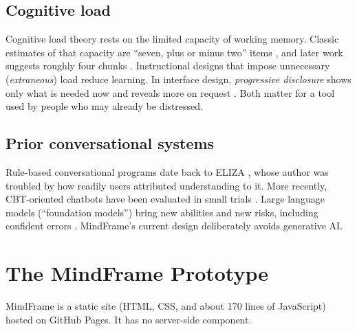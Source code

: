 \documentclass[11pt]{article}
\begin{document}
\subsection{Cognitive load}
Cognitive load theory \citep{sweller1988} rests on the limited capacity of working memory. Classic estimates of that capacity are ``seven, plus or minus two'' items \citep{miller1956}, and later work suggests roughly four chunks \citep{cowan2001}. Instructional designs that impose unnecessary (\emph{extraneous}) load reduce learning. In interface design, \emph{progressive disclosure} shows only what is needed now and reveals more on request \citep{nielsen2006}. Both matter for a tool used by people who may already be distressed.

\subsection{Prior conversational systems}
Rule-based conversational programs date back to ELIZA \citep{weizenbaum1966}, whose author was troubled by how readily users attributed understanding to it. More recently, CBT-oriented chatbots have been evaluated in small trials \citep[e.g.,][]{fitzpatrick2017}. Large language models (``foundation models'') bring new abilities and new risks, including confident errors \citep{bommasani2021}. MindFrame's current design deliberately avoids generative AI.

\section{The MindFrame Prototype}
MindFrame is a static site (HTML, CSS, and about 170 lines of JavaScript) hosted on GitHub Pages. It has no server-side component.
\end{document}
